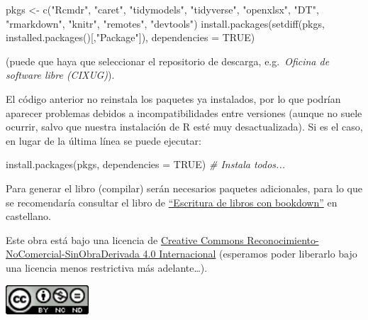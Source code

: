 \documentclass[
]{book}
\newenvironment{Shaded}{\begin{snugshade}}{\end{snugshade}}
\newcommand{\AttributeTok}[1]{\textcolor[rgb]{0.77,0.63,0.00}{#1}}
\newcommand{\CommentTok}[1]{\textcolor[rgb]{0.56,0.35,0.01}{\textit{#1}}}
\newcommand{\ConstantTok}[1]{\textcolor[rgb]{0.00,0.00,0.00}{#1}}
\newcommand{\FunctionTok}[1]{\textcolor[rgb]{0.00,0.00,0.00}{#1}}
\newcommand{\NormalTok}[1]{#1}
\newcommand{\OtherTok}[1]{\textcolor[rgb]{0.56,0.35,0.01}{#1}}
\newcommand{\StringTok}[1]{\textcolor[rgb]{0.31,0.60,0.02}{#1}}
\theoremstyle{break}
\theoremstyle{nonumberplain}
\begin{document}
\begin{Shaded}
\begin{Highlighting}[]
\NormalTok{pkgs }\OtherTok{\textless{}{-}} \FunctionTok{c}\NormalTok{(}\StringTok{"Rcmdr"}\NormalTok{, }\StringTok{"caret"}\NormalTok{, }\StringTok{"tidymodels"}\NormalTok{, }\StringTok{"tidyverse"}\NormalTok{, }\StringTok{"openxlsx"}\NormalTok{, }\StringTok{"DT"}\NormalTok{, }
          \StringTok{"rmarkdown"}\NormalTok{, }\StringTok{"knitr"}\NormalTok{, }\StringTok{"remotes"}\NormalTok{, }\StringTok{"devtools"}\NormalTok{)}
\FunctionTok{install.packages}\NormalTok{(}\FunctionTok{setdiff}\NormalTok{(pkgs, }\FunctionTok{installed.packages}\NormalTok{()[,}\StringTok{"Package"}\NormalTok{]), }\AttributeTok{dependencies =} \ConstantTok{TRUE}\NormalTok{)}
\end{Highlighting}
\end{Shaded}

(puede que haya que seleccionar el repositorio de descarga, e.g.~\emph{Oficina de software libre (CIXUG)}).

El código anterior no reinstala los paquetes ya instalados, por lo que podrían aparecer problemas debidos a incompatibilidades entre versiones (aunque no suele ocurrir, salvo que nuestra instalación de R esté muy desactualizada).
Si es el caso, en lugar de la última línea se puede ejecutar:

\begin{Shaded}
\begin{Highlighting}[]
\FunctionTok{install.packages}\NormalTok{(pkgs, }\AttributeTok{dependencies =} \ConstantTok{TRUE}\NormalTok{) }\CommentTok{\# Instala todos...}
\end{Highlighting}
\end{Shaded}

Para generar el libro (compilar) serán necesarios paquetes adicionales,
para lo que se recomendaría consultar el libro de \href{https://rubenfcasal.github.io/bookdown_intro}{``Escritura de libros con bookdown''} en castellano.

Este obra está bajo una licencia de \href{https://creativecommons.org/licenses/by-nc-nd/4.0/deed.es_ES}{Creative Commons Reconocimiento-NoComercial-SinObraDerivada 4.0 Internacional}
(esperamos poder liberarlo bajo una licencia menos restrictiva más adelante\ldots).

\includegraphics[width=1.22in]{by-nc-nd-88x31}
\end{document}
